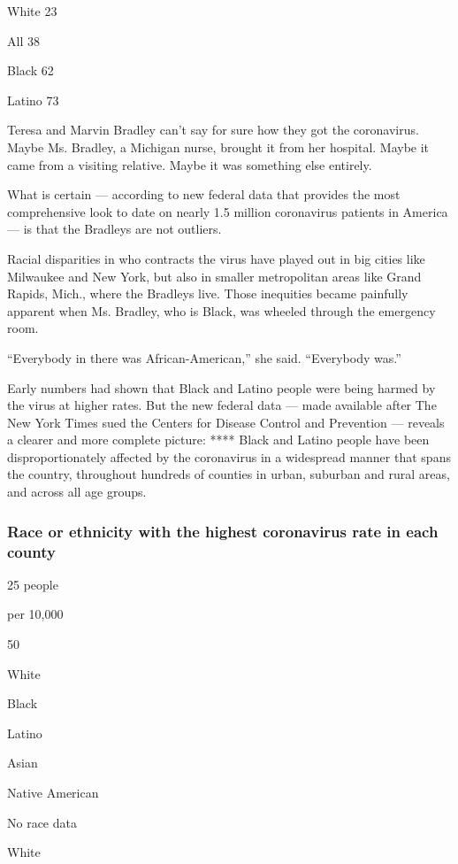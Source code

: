 White 23

All 38

Black 62

Latino 73

Teresa and Marvin Bradley can't say for sure how they got the
coronavirus. Maybe Ms. Bradley, a Michigan nurse, brought it from her
hospital. Maybe it came from a visiting relative. Maybe it was something
else entirely.

What is certain --- according to new federal data that provides the most
comprehensive look to date on nearly 1.5 million coronavirus patients in
America --- is that the Bradleys are not outliers.

Racial disparities in who contracts the virus have played out in big
cities like Milwaukee and New York, but also in smaller metropolitan
areas like Grand Rapids, Mich., where the Bradleys live. Those
inequities became painfully apparent when Ms. Bradley, who is Black, was
wheeled through the emergency room.

``Everybody in there was African-American,'' she said. ``Everybody
was.''

Early numbers had shown that Black and Latino people were being harmed
by the virus at higher rates. But the new federal data --- made
available after The New York Times sued the Centers for Disease Control
and Prevention --- reveals a clearer and more complete picture: ****
Black and Latino people have been disproportionately affected by the
coronavirus in a widespread manner that spans the country, throughout
hundreds of counties in urban, suburban and rural areas, and across all
age groups.

\hypertarget{race-or-ethnicity-with-the-highest-coronavirus-rate-in-each-county}{%
\subsubsection{Race or ethnicity with the highest coronavirus rate in
each
county}\label{race-or-ethnicity-with-the-highest-coronavirus-rate-in-each-county}}

25 people

per 10,000

50

White

Black

Latino

Asian

Native American

No race data

White

